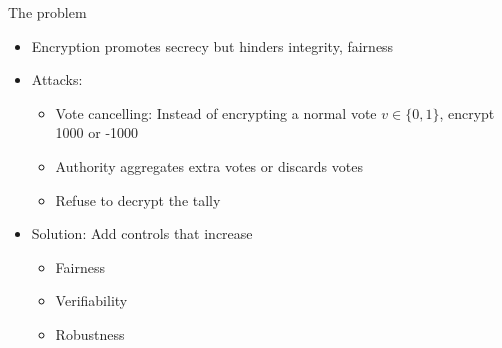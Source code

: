 \documentclass{beamer}
\begin{document}
\begin{frame}{The problem}
\begin{itemize}
\item Encryption promotes secrecy but hinders integrity, fairness
\item Attacks:
	\begin{itemize}
		\item Vote cancelling: Instead of encrypting a normal vote $v \in \{ 0,1 \}$, encrypt 1000 or -1000
		\item Authority aggregates extra votes or discards votes
		\item Refuse to decrypt the tally
	\end{itemize}
\item Solution: Add controls that increase
	\begin{itemize}
		\item Fairness
		\item Verifiability
		\item Robustness
	\end{itemize}
\end{itemize}
\end{frame}
\end{document}
